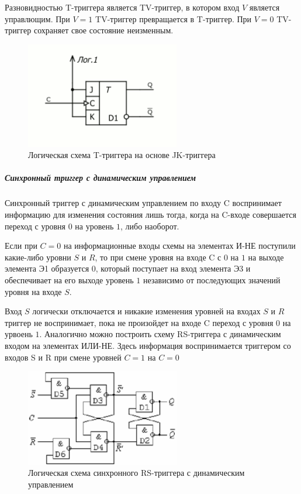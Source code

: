 \documentclass{article}
\begin{document}
\begin{flushleft}
Разновидностью T-триггера является TV-триггер, в котором вход $V$ является управлющим. При $V = 1$ TV-триггер превращается в T-триггер. При $V = 0$ TV-триггер сохраняет свое состояние неизменным.

\begin{figure}
\caption{Логическая схема T-триггера на основе JK-триггера}
\includegraphics[width=0.6\textwidth]{assets/t_trigger.png}
\end{figure}

\subparagraph{Синхронный триггер с динамическим управлением}

Синхронный триггер с динамическим управлением по входу C воспринимает информацию для изменения состояния лишь тогда, когда на C-входе совершается переход с уровня $0$ на уровень $1$, либо наоборот.

Если при $C = 0$ на информационные входы схемы на элементах И-НЕ поступили какие-либо уровни $S$ и $R$, то при смене уровня на входе C с $0$ на $1$ на выходе элемента Э1 образуется $0$, который поступает на вход элемента Э3 и обеспечивает на его выходе уровень $1$ независимо от последующих значений уровня на входе $S$.

Вход $S$ логически отключается и никакие изменения уровней на входах $S$ и $R$ триггер не воспринимает, пока не произойдет на входе C переход с уровня $0$ на урвоень $1$. Аналогично можно построить схему RS-триггера с динамическим входом на элементах ИЛИ-НЕ. Здесь информация воспринимается триггером со входов S и R при смене уровней $C = 1$ на $C = 0$

\begin{figure}
\caption{Логическая схема синхронного RS-триггера с динамическим управлением}
\includegraphics[width=0.6\textwidth]{assets/synchronous_rs_trigger.png}
\end{figure}


\end{flushleft}
\end{document}
